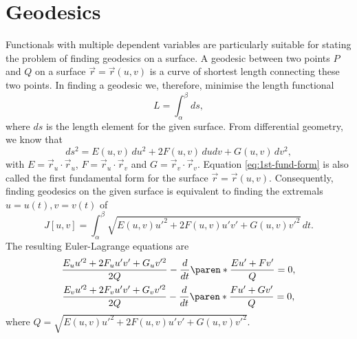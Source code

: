 \documentclass[11pt]{penrose}
\begin{document}
\section{Geodesics}
Functionals with multiple dependent variables are particularly suitable for stating the problem of finding geodesics on a surface. A geodesic between two points $P$ and $Q$ on a surface $\vec{r} = \vec{r}(u,v)$ is a curve of shortest length connecting these two points. In finding a geodesic we, therefore, minimise the length functional
\begin{equation}
    L = \int_\alpha^\beta ds,
\end{equation}
where $ds$ is the length element for the given surface. From differential geometry, we know that
\begin{equation}
    ds^2 = E(u,v) \,du^2 + 2 F(u,v) \,du dv + G(u,v) \,dv^2,
    \label{eq:1st-fund-form}
\end{equation}
with $E = \vec{r}_u \cdot \vec{r}_u$, $F = \vec{r}_u \cdot \vec{r}_v$ and $G = \vec{r}_v \cdot \vec{r}_v$. Equation \eqref{eq:1st-fund-form} is also called the first fundamental form for the surface $\vec{r} = \vec{r}(u,v)$. Consequently, finding geodesics on the given surface is equivalent to finding the extremals $u = u(t), v = v(t)$ of
\begin{equation}
    J[u, v] = \int_\alpha^\beta \sqrt{E(u,v) u'^2 + 2 F(u,v) u' v' + G(u,v) v'^2} \,dt.
\end{equation}
The resulting Euler-Lagrange equations are
\begin{gather}
    \frac{E_u u'^2 + 2F_u u' v' + G_u v'^2}{2Q} - \frac{d}{dt}\paren*{ \frac{E u' + F v'}{Q} } = 0,\\
    \frac{E_v u'^2 + 2F_v u' v' + G_v v'^2}{2Q} - \frac{d}{dt}\paren*{ \frac{F u' + G v'}{Q} } = 0,
\end{gather}
where $Q = \sqrt{E(u,v) u'^2 + 2 F(u,v) u' v' + G(u,v) v'^2}$.
\end{document}
